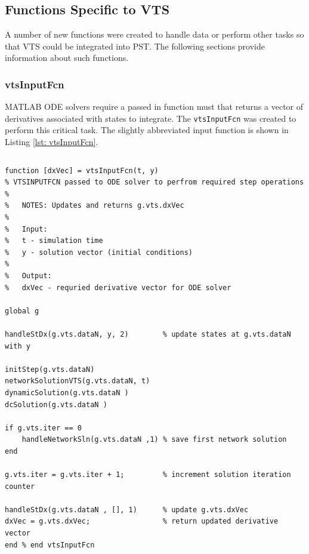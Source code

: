 \subsection{Functions Specific to VTS}  
A number of new functions were created to handle data or perform other tasks so that VTS could be integrated into PST.
The following sections provide information about such functions.

\pagebreak
\subsubsection{vtsInputFcn} 
MATLAB ODE solvers require a passed in function must that returns a vector of derivatives associated with states to integrate.
The \verb|vtsInputFcn| was created to perform this critical task.
The slightly abbreviated input function is shown in Listing \ref{lst: vtsInputFcn}.

\begin{lstlisting}[caption={Abbreviated vtsInputFcn},label={lst: vtsInputFcn}]
\end{lstlisting}\vspace{-2 em}
\begin{verbatim}
function [dxVec] = vtsInputFcn(t, y)
% VTSINPUTFCN passed to ODE solver to perfrom required step operations
%
%   NOTES: Updates and returns g.vts.dxVec
%
%   Input:
%   t - simulation time
%   y - solution vector (initial conditions)
%
%   Output:
%   dxVec - requried derivative vector for ODE solver

global g

handleStDx(g.vts.dataN, y, 2)        % update states at g.vts.dataN with y

initStep(g.vts.dataN)
networkSolutionVTS(g.vts.dataN, t)
dynamicSolution(g.vts.dataN )
dcSolution(g.vts.dataN )

if g.vts.iter == 0
    handleNetworkSln(g.vts.dataN ,1) % save first network solution
end

g.vts.iter = g.vts.iter + 1;         % increment solution iteration counter

handleStDx(g.vts.dataN , [], 1)      % update g.vts.dxVec
dxVec = g.vts.dxVec;                 % return updated derivative vector
end % end vtsInputFcn
\end{verbatim}

